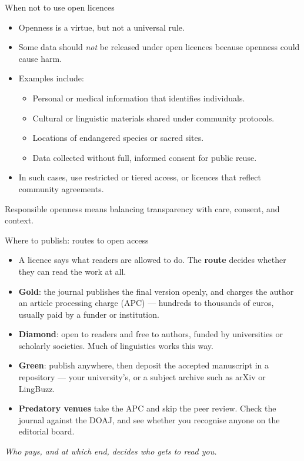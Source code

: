 \documentclass[aspectratio=169]{beamer}
\begin{document}
\begin{frame}{When not to use open licences}
\begin{itemize}
  \item Openness is a virtue, but not a universal rule.  
  \item Some data should \emph{not} be released under open licences because openness could cause harm.
  \item Examples include:
    \begin{itemize}
      \item Personal or medical information that identifies individuals.  
      \item Cultural or linguistic materials shared under community protocols.  
      \item Locations of endangered species or sacred sites.  
      \item Data collected without full, informed consent for public reuse.
    \end{itemize}
  \item In such cases, use restricted or tiered access, or licences that reflect community agreements.
\end{itemize}
\medskip
Responsible openness means balancing transparency with care, consent, and context.
\end{frame}

\begin{frame}{Where to publish: routes to open access}
\begin{itemize}
  \item A licence says what readers are allowed to do.  The \textbf{route}
    decides whether they can read the work at all.
  \item \textbf{Gold}: the journal publishes the final version openly, and
    charges the author an article processing charge (APC) --- hundreds to
    thousands of euros, usually paid by a funder or institution.
  \item \textbf{Diamond}: open to readers and free to authors, funded by
    universities or scholarly societies.  Much of linguistics works this way.
  \item \textbf{Green}: publish anywhere, then deposit the accepted
    manuscript in a repository --- your university's, or a subject archive
    such as arXiv or LingBuzz.
  \item \textbf{Predatory venues} take the APC and skip the peer review.
    Check the journal against the DOAJ, and see whether you recognise anyone
    on the editorial board.
\end{itemize}
\medskip
\textit{Who pays, and at which end, decides who gets to read you.}
\end{frame}
\end{document}
